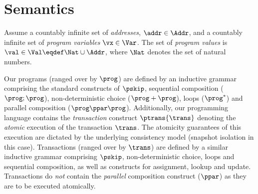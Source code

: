 \section{Semantics\label{sec:semantics}}
\begin{defn}
\label{def:prgram_values}
Assume a countably infinite set of \emph{addresses}, $\addr \in \Addr$, and a countably infinite set of \emph{program variables} $\vx \in {\Var}$. The set of \emph{program values} is $\val \in \Val \eqdef \Nat \cup \Addr$, where $\Nat$ denotes the set of natural numbers.
\end{defn}
%
%
Our programs (ranged over by $\prog$) are defined by an inductive grammar comprising the standard constructs of $\pskip$, sequential composition ($\prog; \prog$), non-deterministic choice ($\prog+\prog$), loops ($\prog^*$) and parallel composition ($\prog \ppar \prog$). Additionally, our programming language contains the \emph{transaction} construct $\ptrans{\trans}$ denoting the \emph{atomic} execution of the transaction $\trans$. The atomicity guarantees of this execution are dictated by the underlying consistency model (snapshot isolation in this case).
Transactions (ranged over by $\trans$) are defined by a similar inductive grammar comprising $\pskip$, non-deterministic choice, loops and sequential composition, as well as constructs for assignment, lookup and update. Transactions do \emph{not} contain the \emph{parallel} composition construct ($\ppar$) as they are to be executed atomically.

